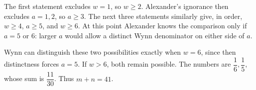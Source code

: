 The first statement excludes $w=1$, so $w\ge2$. Alexander's ignorance then excludes $a=1,2$, so $a\ge3$. The next three statements similarly give, in order, $w\ge4$, $a\ge5$, and $w\ge6$. At this point Alexander knows the comparison only if $a=5$ or $6$: larger $a$ would allow a distinct Wynn denominator on either side of $a$.

Wynn can distinguish these two possibilities exactly when $w=6$, since then distinctness forces $a=5$. If $w>6$, both remain possible. The numbers are $\dfrac{1}{6},\dfrac{1}{5}$, whose sum is $\dfrac{11}{30}$. Thus $\boxed{m+n=41}$.
